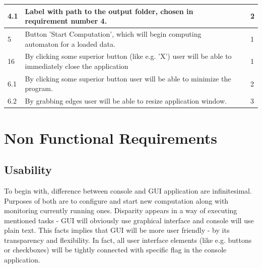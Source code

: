 \documentclass{article}
\begin{document}
\begin{center}
\begin{longtable}{| l | p{4cm} | p{3.5cm} | l |}
		4.1 & 
		Label with path to the output folder, chosen in requirement number 4. & 
		 &
		2 
		\\ \hline		
		

		5 & 
		Button 'Start Computation', which will begin computing automaton for a loaded data. & 
		 &
		1
		\\ \hline		


		16 & 
		By clicking some superior button (like e.g. 'X') user will be able to immediately 				close the application & 
		 &
		1
		\\ \hline
	
		6.1 & 
		By clicking some superior button user will be able to minimize the program. & 
		 &
		2
		\\ \hline	

		6.2 & 
		By grabbing edges user will be able to resize application window. & 
		 &
		3
		\\ \hline
		
	\end{longtable}
\end{center}	



%
%
\section{Non Functional Requirements}


%
%
\subsection{Usability} \label{usability}
To begin with, difference between console and GUI application are infinitesimal. Purposes of both are to configure and start new computation along with monitoring currently running ones.
Disparity appears in a way of executing mentioned tasks - GUI will obviously use graphical interface and console will use plain text. This facts implies that GUI will be more user friendly - by its transparency and flexibility. In fact, all user interface elements (like e.g. buttons or checkboxes) will be tightly connected with specific flag in the console application.

\end{document}
